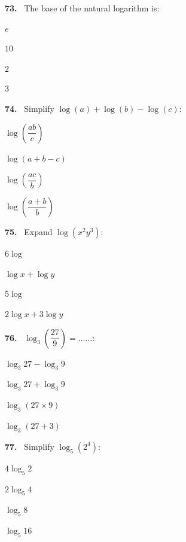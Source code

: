 \documentclass[11pt]{article}
\newenvironment{qenv}[1]{%
  \par\medskip\noindent\textbf{#1.}\ \ignorespaces
}{\par}
\begin{document}
\begin{qenv}{73} The base of the natural logarithm is:
\begin{options} \item $e$ \item $10$ \item $2$ \item $3$ \end{options} \end{qenv}

\begin{qenv}{74} Simplify $\log(a)+\log(b)-\log(c)$:
\begin{options} \item $\log\left(\dfrac{ab}{c}\right)$ \item $\log(a+b-c)$ \item $\log\left(\dfrac{ac}{b}\right)$ \item $\log\left(\dfrac{a+b}{b}\right)$ \end{options} \end{qenv}

\begin{qenv}{75} Expand $\log(x^2y^3)$:
\begin{options} \item $6\log$ \item $\log x + \log y$ \item $5\log$ \item $2\log x + 3\log y$ \end{options} \end{qenv}

\begin{qenv}{76} $\log_3\left(\dfrac{27}{9}\right) = \ldots\ldots$:
\begin{options} \item $\log_3 27 - \log_3 9$ \item $\log_3 27 + \log_3 9$ \item $\log_3(27\times9)$ \item $\log_3(27+3)$ \end{options} \end{qenv}

\begin{qenv}{77} Simplify $\log_5(2^4)$:
\begin{options} \item $4\log_5 2$ \item $2\log_5 4$ \item $\log_5 8$ \item $\log_5 16$ \end{options} \end{qenv}
\end{document}
